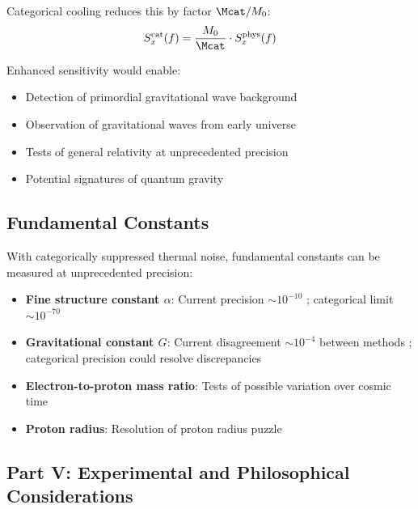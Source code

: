 Categorical cooling reduces this by factor $\Mcat/M_0$:
\begin{equation}
S_x^{\text{cat}}(f) = \frac{M_0}{\Mcat} \cdot S_x^{\text{phys}}(f)
\end{equation}

Enhanced sensitivity would enable:
\begin{itemize}
    \item Detection of primordial gravitational wave background
    \item Observation of gravitational waves from early universe
    \item Tests of general relativity at unprecedented precision
    \item Potential signatures of quantum gravity
\end{itemize}

\subsection{Fundamental Constants}

With categorically suppressed thermal noise, fundamental constants can be measured at unprecedented precision:

\begin{itemize}
    \item \textbf{Fine structure constant $\alpha$}: Current precision $\sim 10^{-10}$ \cite{parker2018}; categorical limit $\sim 10^{-70}$

    \item \textbf{Gravitational constant $G$}: Current disagreement $\sim 10^{-4}$ between methods \cite{quinn2013}; categorical precision could resolve discrepancies

    \item \textbf{Electron-to-proton mass ratio}: Tests of possible variation over cosmic time \cite{uzan2011}

    \item \textbf{Proton radius}: Resolution of proton radius puzzle \cite{pohl2010}
\end{itemize}


\subsection*{Part V: Experimental and Philosophical Considerations}

